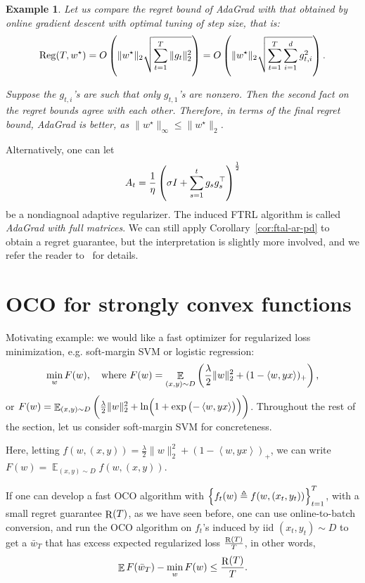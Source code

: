 \documentclass{article}
\newtheorem{example}{Example}
\DeclareMathOperator*{\Reg}{{\rm Reg}}
\DeclareMathOperator*{\R}{{\rm R}}
\DeclareMathOperator{\EE}{{\mathbb E}}
\newcommand{\defeq}{\triangleq}
\newcommand{\inner}[2]{\left\langle #1,#2 \right\rangle}
\begin{document}
\begin{example}
Let us compare the regret bound of AdaGrad with that obtained by online gradient descent with optimal tuning of step size, that is:
\[ \Reg(T, w^\star) = O\del{\| w^\star \|_2 \sqrt{\sum_{t=1}^T \| g_t \|_2^2 }} = O\del{\| w^\star \|_2 \sqrt{\sum_{t=1}^T \sum_{i=1}^d g_{t,i}^2 }}. \]

Suppose the $g_{t,i}$'s are such that only $g_{t,1}$'s are nonzero. Then the second fact on the regret bounds agree with each other. Therefore, in terms of the final regret bound, AdaGrad is better, as $\|w^\star\|_\infty \leq \| w^\star\|_2$.

\end{example}


Alternatively, one can let
\[ A_t = \frac1\eta \del{\sigma I + \sum_{s=1}^t g_s g_s^\top }^\frac12 \]
be a nondiagnoal adaptive regularizer. The induced FTRL algorithm is called {\em AdaGrad with full matrices}. We can still apply Corollary~\ref{cor:ftal-ar-pd} to obtain a regret guarantee, but the interpretation is slightly more involved, and we refer the reader to~\cite[][Section 5.6]{hazan2016introduction} for details.


\section{OCO for strongly convex functions}

Motivating example: we would like a fast optimizer for regularized loss minimization, e.g. soft-margin SVM or logistic regression:
\[ \min_{w} F(w), \quad \text{where } F(w) = \EE_{(x,y) \sim D} \del{\frac\lambda2\|w\|_2^2 + (1-\inner{w}{y x})_+}, \]
or $F(w) = \EE_{(x,y) \sim D} \del{\frac\lambda2\|w\|_2^2 + \ln(1 + \exp\del{-\inner{w}{y x}})}$. Throughout the rest of the section, let us consider soft-margin SVM for concreteness.

Here, letting $f(w, (x,y)) = \frac\lambda2\|w\|_2^2 + (1-\inner{w}{y x})_+$, we can write
$F(w) = \EE_{(x, y) \sim D} f(w, (x,y))$.

If one can develop a fast OCO algorithm with $\cbr{f_t(w) \defeq f(w, (x_t, y_t))}_{t=1}^T$, with a small regret guarantee $\R(T)$, as we have seen before, one can use online-to-batch conversion, and run the OCO algorithm on $f_t$'s induced by iid $(x_t, y_t) \sim D$ to get a $\bar{w}_{T}$ that has excess expected regularized loss $\frac{\R(T)}{T}$, in other words,
\[ \EE F(\bar{w}_T) - \min_{w} F(w) \leq \frac{\R(T)}{T}. \]
\end{document}

